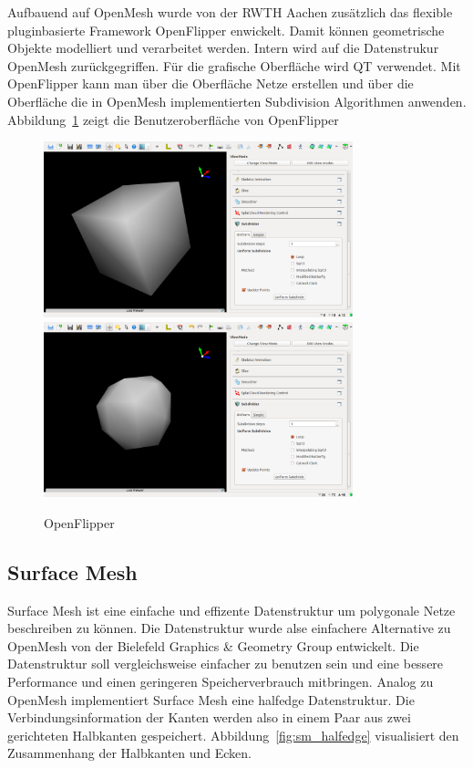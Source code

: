 Aufbauend auf OpenMesh wurde von der \acs{RWTH} Aachen zusätzlich das flexible pluginbasierte Framework OpenFlipper enwickelt.
Damit können geometrische Objekte modelliert und verarbeitet werden. Intern wird auf die Datenstrukur OpenMesh zurückgegriffen.
Für die grafische Oberfläche wird QT verwendet.
Mit OpenFlipper kann man über die Oberfläche Netze erstellen und über die Oberfläche die in OpenMesh implementierten Subdivision Algorithmen anwenden.
Abbildung~\ref{fig:openflipper} zeigt die Benutzeroberfläche von OpenFlipper
\begin{figure}[h]
  \caption{OpenFlipper}
  \centering
  \includegraphics[width=0.8\textwidth]{content/media/openflipper_cube}
  \includegraphics[width=0.8\textwidth]{content/media/openflipper_loop}
  \label{fig:openflipper}
\end{figure}


\subsection{Surface Mesh}

Surface Mesh ist eine einfache und effizente Datenstruktur um polygonale Netze beschreiben zu können.
Die Datenstruktur wurde alse einfachere Alternative zu OpenMesh von der Bielefeld Graphics \& Geometry Group entwickelt.
Die Datenstruktur soll vergleichsweise einfacher zu benutzen sein und eine bessere Performance und einen geringeren Speicherverbrauch mitbringen.
Analog zu OpenMesh implementiert Surface Mesh eine halfedge Datenstruktur.
Die Verbindungsinformation der Kanten werden also in einem Paar aus zwei gerichteten Halbkanten gespeichert.
Abbildung~\ref{fig:sm_halfedge} visualisiert den Zusammenhang der Halbkanten und Ecken.

